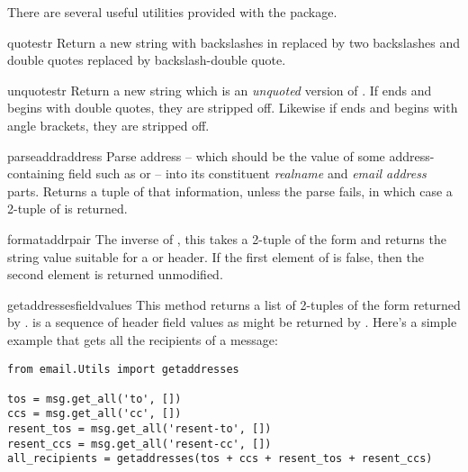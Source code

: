 
There are several useful utilities provided with the 
package.

\begin{funcdesc}{quote}{str}
Return a new string with backslashes in  replaced by two
backslashes and double quotes replaced by backslash-double quote.
\end{funcdesc}

\begin{funcdesc}{unquote}{str}
Return a new string which is an \emph{unquoted} version of .
If  ends and begins with double quotes, they are stripped
off.  Likewise if  ends and begins with angle brackets, they
are stripped off.
\end{funcdesc}

\begin{funcdesc}{parseaddr}{address}
Parse address -- which should be the value of some address-containing
field such as  or  -- into its constituent
\emph{realname} and \emph{email address} parts.  Returns a tuple of that
information, unless the parse fails, in which case a 2-tuple of
 is returned.
\end{funcdesc}

\begin{funcdesc}{formataddr}{pair}
The inverse of , this takes a 2-tuple of the form
 and returns the string value suitable
for a  or  header.  If the first element of
 is false, then the second element is returned unmodified.
\end{funcdesc}

\begin{funcdesc}{getaddresses}{fieldvalues}
This method returns a list of 2-tuples of the form returned by
.   is a sequence of header field
values as might be returned by .  Here's a
simple example that gets all the recipients of a message:

\begin{verbatim}
from email.Utils import getaddresses

tos = msg.get_all('to', [])
ccs = msg.get_all('cc', [])
resent_tos = msg.get_all('resent-to', [])
resent_ccs = msg.get_all('resent-cc', [])
all_recipients = getaddresses(tos + ccs + resent_tos + resent_ccs)
\end{verbatim}
\end{funcdesc}

